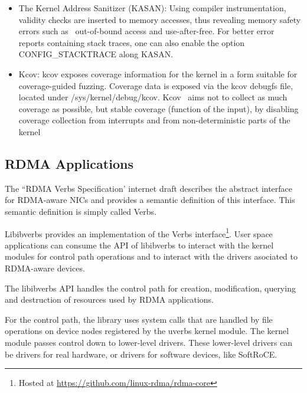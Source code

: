 \begin{itemize}
\item The Kernel Address Sanitizer (KASAN): Using compiler instrumentation, validity checks are inserted to memory accesses, thus revealing memory safety errors such as \
  out-of-bound access and use-after-free. For better error reports containing stack traces, one can also enable the option CONFIG\_STACKTRACE along KASAN\cite{KernelAddressSanitizer}.
\item Kcov: kcov exposes coverage information for the kernel in a form suitable for coverage-guided fuzzing. Coverage data is exposed via the kcov debugfs file, located under /sys/kernel/debug/kcov. Kcov \
  aims not to collect as much coverage as possible, but stable coverage (function of the input), by disabling coverage collection from interrupts and from non-deterministic parts of the kernel\cite{KcovCodeCoveragea}
\end{itemize}



\subsection{RDMA Applications}

The ``RDMA Verbs Specification' internet draft describes the abstract
interface for RDMA-aware NICs and provides a semantic definition of this
interface. This semantic definition is simply called Verbs\cite{hillandRDMAProtocolVerbs}.

Libibverbs provides an implementation of the Verbs interface\footnote{Hosted at \url{https://github.com/linux-rdma/rdma-core}}. User space
applications can consume the API of libibverbs to interact with
the kernel modules for control path operations and to interact with the drivers asociated
to RDMA-aware devices.

The libibverbs API handles the control path for creation, modification, querying and destruction of resources used by RDMA applications.

For the control path, the library uses system calls that are handled by file operations on device nodes
registered by the uverbs kernel module. The kernel module passes control down to lower-level drivers.
These lower-level drivers can be drivers for real hardware, or drivers for software devices, like SoftRoCE.\@

